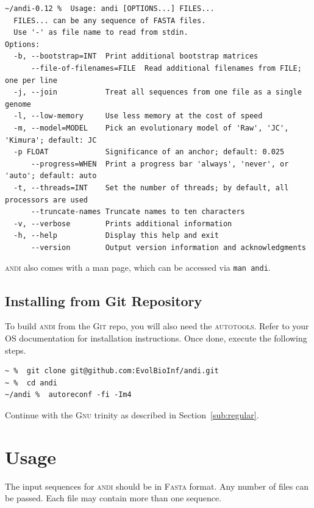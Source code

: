 \documentclass[a4paper,
  10pt,
  english,
  DIV=12,
  BCOR=8mm]{scrbook}
\newcommand{\algo}[1]{\textsc{{#1}}}
\newcommand{\andi}{\algo{andi}\xspace}
\begin{document}
\begin{lstlisting}
~/andi-0.12 %  Usage: andi [OPTIONS...] FILES...
  FILES... can be any sequence of FASTA files.
  Use '-' as file name to read from stdin.
Options:
  -b, --bootstrap=INT  Print additional bootstrap matrices
      --file-of-filenames=FILE  Read additional filenames from FILE; one per line
  -j, --join           Treat all sequences from one file as a single genome
  -l, --low-memory     Use less memory at the cost of speed
  -m, --model=MODEL    Pick an evolutionary model of 'Raw', 'JC', 'Kimura'; default: JC
  -p FLOAT             Significance of an anchor; default: 0.025
      --progress=WHEN  Print a progress bar 'always', 'never', or 'auto'; default: auto
  -t, --threads=INT    Set the number of threads; by default, all processors are used
      --truncate-names Truncate names to ten characters
  -v, --verbose        Prints additional information
  -h, --help           Display this help and exit
      --version        Output version information and acknowledgments
\end{lstlisting}

\noindent \andi also comes with a man page, which can be accessed via \lstinline$man andi$. %

\section{Installing from Git Repository}

To build \andi from the \algo{Git} repo, you will also need the \algo{autotools}. Refer to your OS documentation for installation instructions. Once done, execute the following steps.

\begin{lstlisting}
~ %  git clone git@github.com:EvolBioInf/andi.git
~ %  cd andi
~/andi %  autoreconf -fi -Im4
\end{lstlisting}

\noindent Continue with the \algo{Gnu} trinity as described in Section~\ref{sub:regular}.


\chapter{Usage} %

The input sequences for \andi should be in \algo{Fasta} format. Any number of files can be passed. Each file may contain more than one sequence.
\end{document}
